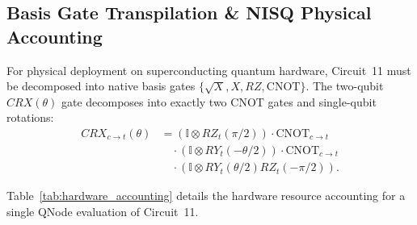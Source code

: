 \documentclass[journal]{IEEEtran}
\begin{document}
\subsection{Basis Gate Transpilation \& NISQ Physical Accounting}
For physical deployment on superconducting quantum hardware, Circuit~11 must be decomposed into native basis gates $\{\sqrt{X}, X, RZ, \mathrm{CNOT}\}$.
The two-qubit $CRX(\theta)$ gate decomposes into exactly two CNOT gates and single-qubit rotations:
\begin{align}
CRX_{c \to t}(\theta) &= (\mathbb{I} \otimes RZ_t(\pi/2)) \cdot \mathrm{CNOT}_{c \to t} \nonumber \\
&\quad \cdot (\mathbb{I} \otimes RY_t(-\theta/2)) \cdot \mathrm{CNOT}_{c \to t} \nonumber \\
&\quad \cdot (\mathbb{I} \otimes RY_t(\theta/2) RZ_t(-\pi/2)).
\label{eq:crx_transpilation}
\end{align}

Table~\ref{tab:hardware_accounting} details the hardware resource accounting for a single QNode evaluation of Circuit~11.

\begin{table}[!htbp]
\centering
\caption{Native Basis Gate Transpilation Accounting for Circuit~11 (4 Qubits)}
\label{tab:hardware_accounting}
\renewcommand{\arraystretch}{1.15}
\end{table}
\end{document}
